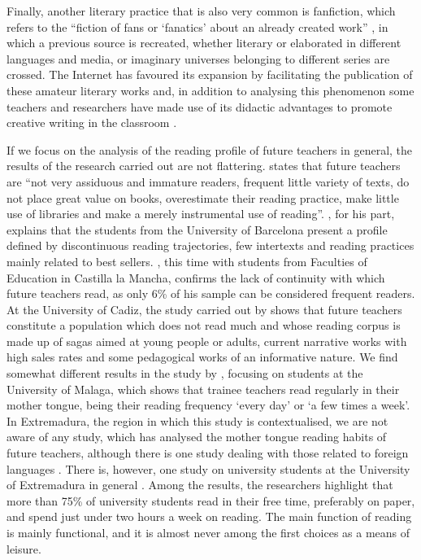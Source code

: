 \documentclass[english]{textolivre}
\begin{document}
Finally, another literary practice that is also very common is fanfiction, which refers to the “fiction of fans or ‘fanatics’ about an already created work” \cite[p.65]{martos_nunez_tunear_2006}, in which a previous source is recreated, whether literary or elaborated in different languages and media, or imaginary universes belonging to different series are crossed. The Internet has favoured its expansion by facilitating the publication of these amateur literary works and, in addition to analysing this phenomenon \cite{luna_pena_lectura_2020, quiroga_terreros_formas_2017, perez_silva_internet_2020} some teachers and researchers have made use of its didactic advantages to promote creative writing in the classroom \cite{abdad_ruiz_fanfiction:_2011, paterna_roda_fanfiction_2018}.

If we focus on the analysis of the reading profile of future teachers in general, the results of the research carried out are not flattering. \textcite[p.44]{granado_teachers_2014} states that future teachers are “not very assiduous and immature readers, frequent little variety of texts, do not place great value on books, overestimate their reading practice, make little use of libraries and make a merely instrumental use of reading”. \textcite{munita_reading_2014}, for his part, explains that the students from the University of Barcelona present a profile defined by discontinuous reading trajectories, few intertexts and reading practices mainly related to best sellers. \textcite{vera_valencia_reading_2017}, this time with students from Faculties of Education in Castilla la Mancha, confirms the lack of continuity with which future teachers read, as only 6\% of his sample can be considered frequent readers. At the University of Cadiz, the study carried out by \textcite{trigo_habitos_2020} shows that future teachers constitute a population which does not read much and whose reading corpus is made up of sagas aimed at young people or adults, current narrative works with high sales rates and some pedagogical works of an informative nature. We find somewhat different results in the study by \textcite{castillo_rodriguez_habitos_2022}, focusing on students at the University of Malaga, which shows that trainee teachers read regularly in their mother tongue, being their reading frequency ‘every day’ or ‘a few times a week’. In Extremadura, the region in which this study is contextualised, we are not aware of any study, which has analysed the mother tongue reading habits of future teachers, although there is one study dealing with those related to foreign languages \cite{de_la_maya_retamar_habitos_2021}. There is, however, one study on university students at the University of Extremadura in general \cite{perez-parejo_habitos_2019}. Among the results, the researchers highlight that more than 75\% of university students read in their free time, preferably on paper, and spend just under two hours a week on reading. The main function of reading is mainly functional, and it is almost never among the first choices as a means of leisure. 
\end{document}
